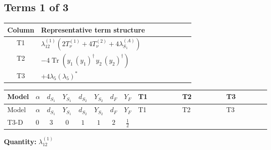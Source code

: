 \documentclass[8pt]{article}
\begin{document}
\begin{landscape}
\subsection*{Terms 1 of 3}
\begin{center}
\begin{tabular}{@{}c >{\raggedright\arraybackslash}p{0.82\linewidth}@{}}
\toprule
Column & Representative term structure \\
\midrule
T1 & \(\displaystyle {\lambda_{12}^{(1)}} (2 T_{\nu}^{(1)}+4 T_{\nu}^{(2)}+4 {\lambda_{S_1}^{(A)}})\) \\
\midrule
T2 & \(\displaystyle -4 \operatorname{Tr}\!\left({y_1}\,\left({y_1}\right)^{\dagger}\,{y_2}\,\left({y_2}\right)^{\dagger}\right)\) \\
\midrule
T3 & \(\displaystyle +4 {\lambda_5} \left({\lambda_5}\right)^{*}\) \\
\midrule
\bottomrule
\end{tabular}
\end{center}
\smallskip
\tiny
\begin{longtable}{@{}llcccccc >{\raggedright\arraybackslash}p{0.21\linewidth} >{\raggedright\arraybackslash}p{0.21\linewidth} >{\raggedright\arraybackslash}p{0.21\linewidth}@{}}
\toprule
Model & $\alpha$ & $d_{S_1}$ & $Y_{S_1}$ & $d_{S_2}$ & $Y_{S_2}$ & $d_F$ & $Y_F$ & T1 & T2 & T3 \\
\midrule
\endfirsthead
\toprule
Model & $\alpha$ & $d_{S_1}$ & $Y_{S_1}$ & $d_{S_2}$ & $Y_{S_2}$ & $d_F$ & $Y_F$ & T1 & T2 & T3 \\
\midrule
\endhead
T3-D & $0$ & $3$ & $0$ & $1$ & $1$ & $2$ & $\frac{1}{2}$ & \scriptsize\adjustbox{max width=\linewidth}{$\begin{gathered} {\lambda_{12}^{(1)}} (2 T_{\nu}^{(1)}+4 T_{\nu}^{(2)}+4 {\lambda_{S_1}^{(A)}})\end{gathered}$} & \scriptsize\adjustbox{max width=\linewidth}{$\begin{gathered} -4 \operatorname{Tr}\!\left({y_1}\,\left({y_1}\right)^{\dagger}\,{y_2}\,\left({y_2}\right)^{\dagger}\right)\end{gathered}$} & \scriptsize\adjustbox{max width=\linewidth}{$\begin{gathered} +4 {\lambda_5} \left({\lambda_5}\right)^{*}\end{gathered}$} \\
\midrule
\bottomrule
\end{longtable}
\clearpage
\noindent\textbf{Quantity: }$\lambda_{12}^{(1)}$\par\smallskip

\end{landscape}
\end{document}
